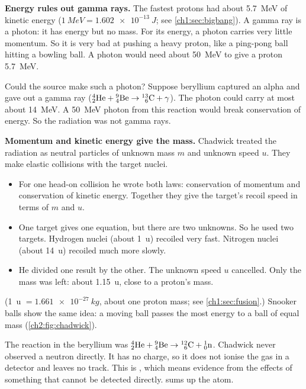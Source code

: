 \textbf{Energy rules out gamma rays.} The fastest protons had about
\qty{5.7}{MeV} of kinetic energy ($\qty{1}{MeV} = \qty{1.602e-13}{J}$; see
\cref{ch1:sec:bigbang}). A gamma ray is a photon: it has energy but no mass. For
its energy, a photon carries very little momentum. So it is very bad at pushing
a heavy proton, like a ping-pong ball hitting a bowling ball. A photon would
need about \qty{50}{MeV} to give a proton \qty{5.7}{MeV}.

Could the source make such a photon? Suppose beryllium captured an alpha and gave
out a gamma ray
($\chTwoNuc{4}{2}{He} + \chTwoNuc{9}{4}{Be} \rightarrow \chTwoNuc{13}{6}{C} + \gamma$).
The photon could carry at most about \qty{14}{MeV}. A \qty{50}{MeV} photon from
this reaction would break conservation of energy. So the radiation was not
gamma rays.

\textbf{Momentum and kinetic energy give the mass.} Chadwick treated the
radiation as neutral particles of unknown mass $m$ and unknown speed $u$. They
make elastic collisions with the target nuclei.
\begin{itemize}
  \item For one head-on collision he wrote both laws: conservation of momentum
        and conservation of kinetic energy. Together they give the target's
        recoil speed in terms of $m$ and $u$.
  \item One target gives one equation, but there are two unknowns. So he used
        two targets. Hydrogen nuclei (about \qty{1}{u}) recoiled very fast.
        Nitrogen nuclei (about \qty{14}{u}) recoiled much more slowly.
  \item He divided one result by the other. The unknown speed $u$ cancelled.
        Only the mass was left: about \qty{1.15}{u}, close to a proton's mass.
\end{itemize}
(\qty{1}{u} $= \qty{1.661e-27}{kg}$, about one proton mass; see \cref{ch1:sec:fusion}.)
Snooker balls show the same idea: a moving ball passes the most energy to a ball
of equal mass (\cref{ch2:fig:chadwick}).

The reaction in the beryllium was
$\chTwoNuc{4}{2}{He} + \chTwoNuc{9}{4}{Be} \rightarrow \chTwoNuc{12}{6}{C} + \chTwoNuc{1}{0}{n}$.
Chadwick never observed a neutron directly. It has no charge, so it does not
ionise the gas in a detector and leaves no track. This is , which means evidence from the effects of something that cannot be
detected directly.  sums up the atom.

